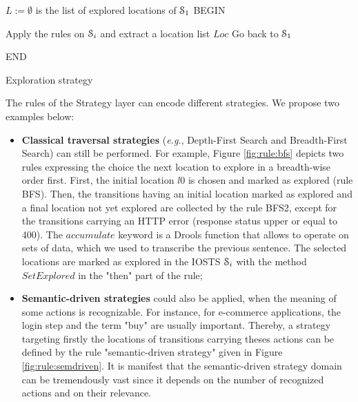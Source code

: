 \begin{algorithm}[h]
 


$L:=\emptyset$ is the list of explored locations of $\EuScript{S}_1$\;
BEGIN\;
{
Apply the rules on $\EuScript{S}_i$ and extract a  location list $Loc$\;
Go back to $\EuScript{S}_1$\;

}
END\;

\caption{Exploration strategy}
\label{exploration-strategy}
\end{algorithm}

The rules of the Strategy layer can encode different strategies.
We propose two examples below:

\begin{itemize}
    \item \textbf{Classical traversal strategies} (\emph{e.g.},
        Depth-First Search and Breadth-First Search) can still be
        performed.  For example, Figure \ref{fig:rule:bfs}
        depicts two rules expressing the choice the next location
        to explore in a breadth-wise order first. First, the
        initial location $l0$ is chosen and marked as explored
        (rule BFS).  Then, the transitions having an initial
        location marked as explored and a final location not yet
        explored are collected by the rule BFS2, except for the
        transitions carrying an HTTP error (response status upper
        or equal to 400).  The $accumulate$ keyword is a Drools
        function that allows to operate on sets of data, which we
        used to transcribe the previous sentence.  The selected
        locations are marked as explored in the IOSTS
        $\EuScript{S}_i$ with the method $SetExplored$ in the
        "then" part of the rule;

    \item \textbf{Semantic-driven strategies} could also be
        applied, when the meaning of some actions is
        recognizable. For instance, for e-commerce applications,
        the login step and the term "buy" are usually important.
        Thereby, a strategy targeting firstly the locations of
        transitions carrying theses actions can be defined by the
        rule "semantic-driven strategy" given in Figure
        \ref{fig:rule:semdriven}.  It is manifest that the
        semantic-driven strategy domain can be tremendously vast
        since it depends on the number of recognized actions and
        on their relevance.
\end{itemize}

